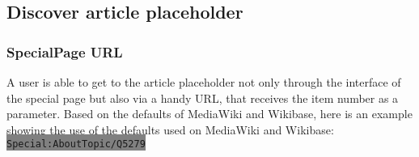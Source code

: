 \subsection{Discover article placeholder}
\subsubsection{SpecialPage URL}
A user is able to get to the article placeholder not only through the interface of the special page but also via a handy URL, that receives the item number as a parameter. Based on the defaults of MediaWiki and Wikibase, here is an example showing the use of the defaults used on MediaWiki and Wikibase: \colorbox{Gray}{\lstinline[basicstyle=\ttfamily\color{white}]|Special:AboutTopic/Q5279|} \\

